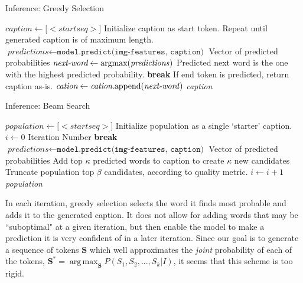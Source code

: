 \documentclass[letterpaper, 10 pt, conference]{ieeeconf}
\DeclareMathOperator*{\argmax}{arg\,max}
\begin{document}
\begin{algorithm*}[h]
\caption{Inference: Greedy Selection}\label{greedy-sampling}
\begin{algorithmic}[1]
\State $\textit{caption} \gets \text{[}<startseq>\text{]}$
\Comment Initialize caption as start token.
\Comment Repeat until generated caption is of maximum length.
\State $\textit{predictions} \gets \texttt{model.predict(img-features, caption)}$
\Comment Vector of predicted probabilities
\State $\textit{next-word} \gets \text{argmax(\textit{predictions})}$
\Comment Predicted next word is the one with the highest predicted probability.
\State \textbf{break}
\Comment If end token is predicted, return caption as-is.
\Else
\State $\textit{cation} \gets \textit{cation}\text{.append(\textit{next-word})}$
\EndIf
\EndWhile
\Return \textit{caption}
\EndProcedure
\end{algorithmic}
\end{algorithm*}


\begin{algorithm*}[h]
\caption{Inference: Beam Search}\label{beam-search}
\begin{algorithmic}[1]
\State $\textit{population} \gets \text{[}<startseq>\text{]}$
\Comment Initialize population as a single `starter' caption.
\State $i \gets 0$
\Comment Iteration Number
\State \textbf{break}
\EndIf
\State $\textit{predictions} \gets \texttt{model.predict(img-features, caption)}$
\Comment Vector of predicted probabilities
\State Add top $\kappa$ predicted words to caption to create $\kappa$ new candidates
\EndFor
\State Truncate population top $\beta$ candidates, according to quality metric.
\State $i \gets i + 1$
\EndFor
\Return \textit{population}
\EndProcedure
\end{algorithmic}
\end{algorithm*}

In each iteration, greedy selection selects the word it finds most probable and adds it to the generated caption. It does not allow for adding words that may be ``suboptimal" at a given iteration, but then enable the model to make a prediction it is very confident of in a later iteration. Since our goal is to generate a sequence of tokens $\textbf{S}$ which well approximates the \textit{joint} probability of each of the tokens, $\textbf{S}^* = \argmax_{\textbf{S}}{P(S_1, S_2, ..., S_k|I)}$, it seems that this scheme is too rigid. 
\end{document}
